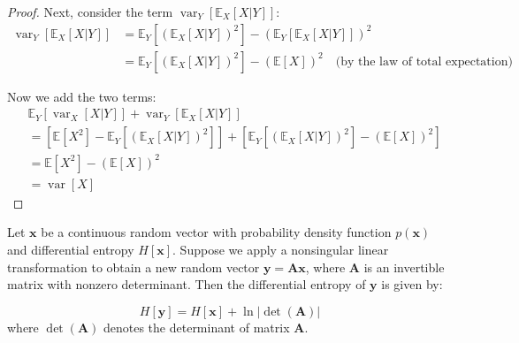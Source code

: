 \documentclass[../main.tex]{subfiles}
\begin{document}
\begin{proof}
Next, consider the term $\operatorname{var}_{Y}[\mathbb{E}_{X}[X|Y]]$:
\begin{align*}
\operatorname{var}_{Y}[\mathbb{E}_{X}[X|Y]] &= \mathbb{E}_{Y}[(\mathbb{E}_{X}[X|Y])^2] - (\mathbb{E}_{Y}[\mathbb{E}_{X}[X|Y]])^2 \\
&= \mathbb{E}_{Y}[(\mathbb{E}_{X}[X|Y])^2] - (\mathbb{E}[X])^2 \quad \text{(by the law of total expectation)}
\end{align*}

Now we add the two terms:
\begin{align*}
&\mathbb{E}_{Y}[\operatorname{var}_{X}[X|Y]] + \operatorname{var}_{Y}[\mathbb{E}_{X}[X|Y]] \\
&= \left[ \mathbb{E}[X^2] - \mathbb{E}_{Y}[(\mathbb{E}_{X}[X|Y])^2] \right] + \left[ \mathbb{E}_{Y}[(\mathbb{E}_{X}[X|Y])^2] - (\mathbb{E}[X])^2 \right] \\
&= \mathbb{E}[X^2] - (\mathbb{E}[X])^2 \\
&= \operatorname{var}[X]
\end{align*}
\end{proof}

\begin{yellow}
\begin{theorem}
    
Let $\mathbf{x}$ be a continuous random vector with probability density function $p(\mathbf{x})$ and differential entropy $H[\mathbf{x}]$. Suppose we apply a nonsingular linear transformation to obtain a new random vector $\mathbf{y} = \mathbf{A}\mathbf{x}$, where $\mathbf{A}$ is an invertible matrix with nonzero determinant. Then the differential entropy of $\mathbf{y}$ is given by:

\begin{equation*}
H[\mathbf{y}] = H[\mathbf{x}] + \ln |\det(\mathbf{A})|
\end{equation*}
where $\det(\mathbf{A})$ denotes the determinant of matrix $\mathbf{A}$.

\end{theorem}
\end{yellow}
\end{document}
